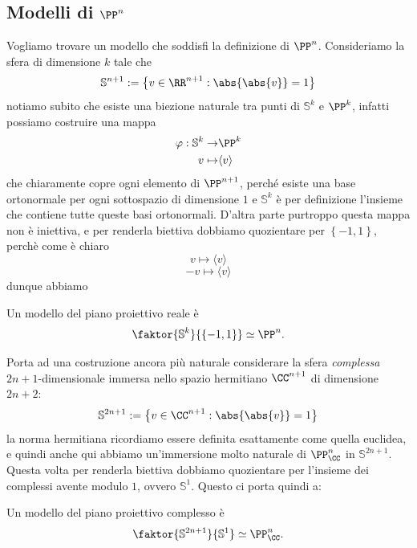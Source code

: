 \documentclass[11pt]{scrartcl}
\begin{document}
   	 \subsection{Modelli di $\PP^n$}
   	 Vogliamo trovare un modello che soddisfi la definizione di $\PP^n$. Consideriamo la sfera di dimensione $k$ tale che
   	 $$\mathbb{S}^{n+1}:=\left\{v\in \RR^{n+1}:\abs{\abs{v}}=1\right\}$$
   	 notiamo subito che esiste una biezione naturale tra punti di $\mathbb{S}^k$ e $\PP^k$, infatti possiamo costruire una mappa 
   	 \begin{align*}
   	 	\varphi:\mathbb{S}^k\to &\PP^k \\
   	 	v\mapsto & \langle v \rangle
   	 \end{align*}
   	 che chiaramente copre ogni elemento di $\PP^{n+1}$, perché esiste una base ortonormale per ogni sottospazio di dimensione $1$ e $\mathbb{S}^k$ è per definizione l'insieme che contiene tutte queste basi ortonormali. D'altra parte purtroppo questa mappa non è iniettiva, e per renderla biettiva dobbiamo quozientare per $\left\{-1,1\right\}$, perchè come è chiaro 
   	 $$v\mapsto \langle v\rangle$$
   	 $$-v\mapsto \langle v \rangle$$
   	 dunque abbiamo
   	 \begin{example}
   	 	Un modello del piano proiettivo reale è
   	 	$$\faktor{\mathbb{S}^k}{\left\{-1,1\right\}}\simeq \PP^n.$$
   	 \end{example}
   	 Porta ad una costruzione ancora più naturale considerare la sfera \textit{complessa} $2n+1$-dimensionale immersa nello spazio hermitiano $\CC^{n+1}$ di dimensione $2n+2$:
   	 $$\mathbb{S}^{2n+1}:=\left\{v\in \CC^{n+1}:\abs{\abs{v}}=1\right\}$$
   	 la norma hermitiana ricordiamo essere definita esattamente come quella euclidea, e quindi anche qui abbiamo un'immersione molto naturale di $\PP^n_\CC$ in $\mathbb{S}^{2n+1}$. Questa volta per renderla biettiva dobbiamo quozientare per l'insieme dei complessi avente modulo $1$, ovvero $\mathbb{S}^1$. Questo ci porta quindi a:
   	 \begin{example}
		Un modello del piano proiettivo complesso è
		$$\faktor{\mathbb{S}^{2n+1}}{\mathbb{S}^1}\simeq \PP^n_\CC.$$
   	 \end{example}
\end{document}
